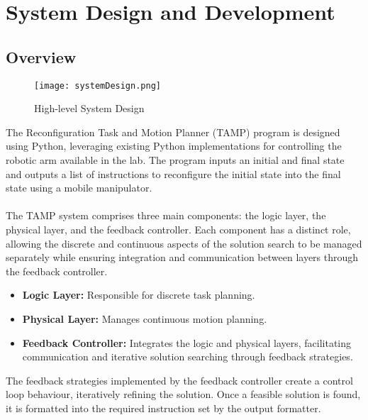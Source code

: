 \section{System Design and Development}
\subsection{Overview}
\begin{figure*}[h]
	\centering
	\texttt{[image: systemDesign.png]}
	\caption{High-level System Design}
	\label{systemDesign}
\end{figure*}

The Reconfiguration Task and Motion Planner (TAMP) program is designed using Python, leveraging existing Python implementations\cite{EVASDK} for controlling the robotic arm \cite{evaSpec} available in the lab. The program inputs an initial and final state and outputs a list of instructions to reconfigure the initial state into the final state using a mobile manipulator.
\\\\
The TAMP system comprises three main components: the logic layer, the physical layer, and the feedback controller. Each component has a distinct role, allowing the discrete and continuous aspects of the solution search to be managed separately while ensuring integration and communication between layers through the feedback controller.
\begin{itemize}[]
	\item\textbf{Logic Layer:} Responsible for discrete task planning.
	\item\textbf{Physical Layer:} Manages continuous motion planning.
	\item\textbf{Feedback Controller:} Integrates the logic and physical layers, facilitating communication and iterative solution searching through feedback strategies.
\end{itemize}
The feedback strategies implemented by the feedback controller create a control loop behaviour, iteratively refining the solution. Once a feasible solution is found, it is formatted into the required instruction set by the output formatter.



